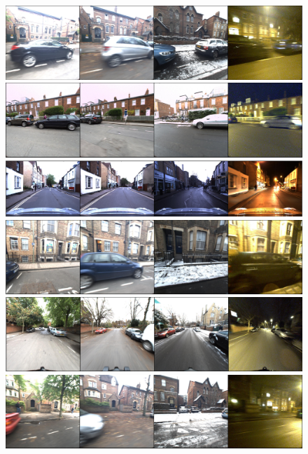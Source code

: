 \begin{figure}
	\centering
	
	\begin{minipage}{0.435\linewidth}
		\includegraphics[width=\linewidth]{details/oxf_exs/ex1}
		
		\includegraphics[width=\linewidth]{details/oxf_exs/ex2}
		
		\includegraphics[width=\linewidth]{details/oxf_exs/ex4}
		
		\includegraphics[width=\linewidth]{details/oxf_exs/ex6}
		
		\includegraphics[width=\linewidth]{details/oxf_exs/ex3}
		
		\includegraphics[width=\linewidth]{details/oxf_exs/ex5}
		

\end{minipage}
\end{figure}

